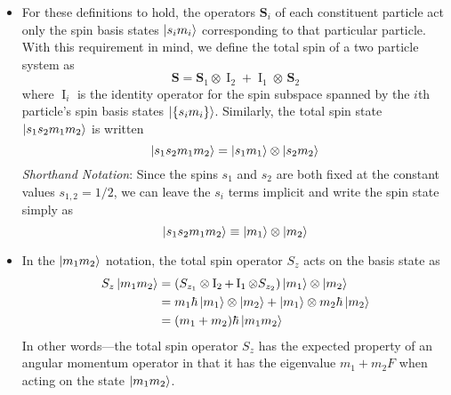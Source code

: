 \documentclass[11pt, a4paper]{article}
\renewcommand{\vec}[1]{\bm{#1}}  %
\renewcommand{\S}{\vec{S}}  %
\newcommand{\II}{\operatorname{I}}  %
\begin{document}
\begin{itemize}
	\item For these definitions to hold, the operators $ \S_{i} $ of each constituent particle act only the spin basis states $ \ket{s_{i}m_{i}} $ corresponding to that particular particle. With this requirement in mind, we define the total spin of a two particle system as
	\begin{equation*}
		\S = \S_{1}\otimes \II_{2} + \II_{1} \otimes \, \S_{2}
	\end{equation*}
	where $ \II_{i} $ is the identity operator for the spin subspace spanned by the $ i $th particle's spin basis states $ \ket{\{s_{i}m_{i}\}} $. Similarly, the total spin state $ \ket{s_{1}s_{2}m_{1}m_{2}} $ is written
	\begin{equation*}
		\ket{s_{1}s_{2}m_{1}m_{2}}  = \ket{s_{1}m_{1}} \otimes \ket{s_{2}m_{2}} 
	\end{equation*}
	\textit{Shorthand Notation}: Since the spins $ s_{1} $ and $ s_{2} $ are both fixed at the constant values $ s_{1,2} = 1/2 $, we can leave the $ s_{i} $ terms implicit and write the spin state simply as
    \begin{equation*}
        \ket{s_{1}s_{2}m_{1}m_{2}} \equiv \ket{m_{1}} \otimes \ket{m_{2}} 
    \end{equation*}
        
    \item In the $ \ket{m_{1}m_{2}} $ notation, the total spin operator $ S_{z} $ acts on the basis state as
    \begin{align*}
        S_{z}\ket{m_{1}m_{2}} &= (S_{z_{1}}\otimes \II_{2} + \II_{1}\otimes S_{z_{2}})\ket{m_{1}} \otimes \ket{m_{2}}\\
        &= m_{1}\hbar \ket{m_{1}} \otimes \ket{m_{2}} + \ket{m_{1}}\otimes m_{2}\hbar \ket{m_{2}}\\
        &=(m_{1} + m_{2}) \hbar \ket{m_{1}m_{2}}
    \end{align*}
    In other words---the total spin operator $ S_{z} $ has the expected property of an angular momentum operator in that it has the eigenvalue $ m_{1} + m_{2}F $ when acting on the state $ \ket{m_{1}m_{2}} $. 


\end{itemize}
\end{document}
